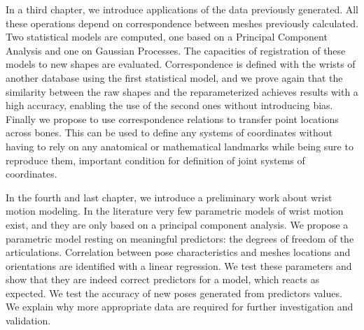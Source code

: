 \documentclass[../../Main_ManuscritThese.tex]{subfiles}
\begin{document}
In a third chapter, we introduce applications of the data previously generated. All these operations depend on correspondence between meshes previously calculated. Two statistical models are computed, one based on a Principal Component Analysis and one on Gaussian Processes. The capacities of registration of these models to new shapes are evaluated. Correspondence is defined with the wrists of another database using the first statistical model, and we prove again that the similarity between the raw shapes and the reparameterized achieves results with a high accuracy, enabling the use of the second ones without introducing bias. Finally we propose to use correspondence relations to transfer point locations across bones. This can be used to define any systems of coordinates without having to rely on any anatomical or mathematical landmarks while being sure to reproduce them, important condition for definition of joint systems of coordinates. 

In the fourth and last chapter, we introduce a preliminary work about wrist motion modeling. In the literature very few parametric models of wrist motion exist, and they are only based on a principal component analysis. We propose a parametric model resting on meaningful predictors: the degrees of freedom of the articulations. Correlation between pose characteristics and meshes locations and orientations are identified with a linear regression. We test these parameters and show that they are indeed correct predictors for a model, which reacts as expected. We test the accuracy of new poses generated from predictors values. %
We explain why more appropriate data are required for further investigation and validation. 



%
%
%
%




\subfileLocal{
	\pagestyle{empty}
	
	
}
\end{document}
